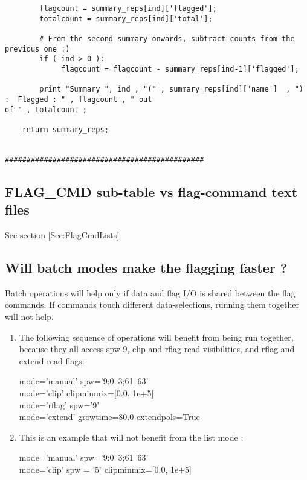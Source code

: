 \begin{verbatim}
        flagcount = summary_reps[ind]['flagged'];
        totalcount = summary_reps[ind]['total'];
     
        # From the second summary onwards, subtract counts from the previous one :)
        if ( ind > 0 ):
             flagcount = flagcount - summary_reps[ind-1]['flagged'];

        print "Summary ", ind , "(" , summary_reps[ind]['name']  , ") :  Flagged : " , flagcount , " out 
of " , totalcount ;

    return summary_reps; 


##############################################

\end{verbatim}


\subsection{FLAG\_CMD sub-table vs flag-command text files}
See section \ref{Sec:FlagCmdLists}


\subsection{Will batch modes make the flagging faster ?}

Batch operations will help only if data and flag I/O is shared between the flag commands.  
If commands touch different data-selections, running them together will not help.

\begin{enumerate}
\item The following sequence of operations will benefit from being run together, 
because they all access spw 9, clip and rflag read visibilities, and rflag and extend read flags:

mode='manual'  spw='9:0~3;61~63' \\
mode='clip'  clipminmix=[0.0, 1e+5] \\
mode='rflag'   spw='9' \\
mode='extend'  growtime=80.0   extendpols=True 

\item This is an example that will not benefit from the list mode : 

mode='manual'  spw='9:0~3;61~63' \\
mode='clip'  spw = '5'  clipminmix=[0.0, 1e+5] 

\end{enumerate}




